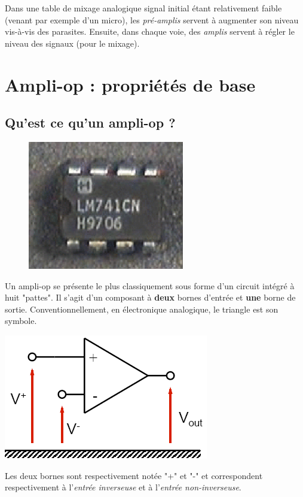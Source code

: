 \documentclass	[11pt, a4paper, openany]{book}
\begin{document}
Dans une  table de mixage analogique signal initial étant relativement faible (venant par exemple d'un micro), les \textit{pré-amplis} servent à augmenter son niveau vis-à-vis des parasites. Ensuite, dans chaque voie, des \textit{amplis} servent à régler le niveau des signaux (pour le mixage).



\section{Ampli-op : propriétés de base}
\subsection{Qu'est ce qu'un ampli-op ?}
\begin{figure}
\includegraphics[scale=0.25]{img/image37}
\end{figure}

Un ampli-op se présente le plus classiquement sous forme d'un circuit intégré à huit "pattes". Il s'agit d'un composant à \textbf{deux} bornes d'entrée et \textbf{une} borne de sortie. Conventionnellement, en électronique analogique, le triangle est son symbole.
\begin{center}
\includegraphics[scale=0.4]{img/image38}
\end{center}
Les deux bornes sont respectivement notée "+" et "-" et correspondent respectivement à l'\textit{entrée inverseuse} et à l'\textit{entrée non-inverseuse}.
\end{document}
